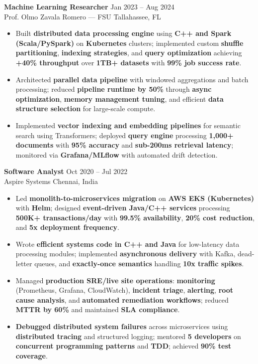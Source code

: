 \documentclass[letterpaper,10pt]{article}
\newcommand{\resumeItem}[1]{\item\small #1}
\newcommand{\resumeSubheading}[4]{
  \vspace{6pt}
  \noindent
  \textbf{#1} \hfill {\footnotesize #2} \\
  [-1pt]
  \noindent
  \small #3 \hfill {\small #4}
  \vspace{3pt}
}
\newcommand{\resumeItemsStart}{\vspace{-2pt}\begin{itemize}}
\newcommand{\resumeItemsEnd}{\end{itemize}\vspace{6pt}}
\begin{document}
\resumeSubheading
{Machine Learning Researcher}{Jan 2023 -- Aug 2024}
{Prof. Olmo Zavala Romero — FSU}{Tallahassee, FL}
\resumeItemsStart
\resumeItem{Built \textbf{distributed data processing engine} using \textbf{C++ and Spark (Scala/PySpark)} on \textbf{Kubernetes} clusters; implemented custom \textbf{shuffle partitioning}, \textbf{indexing strategies}, and \textbf{query optimization} achieving \textbf{+40\% throughput} over \textbf{1TB+ datasets} with \textbf{99\% job success rate}.}
\resumeItem{Architected \textbf{parallel data pipeline} with windowed aggregations and batch processing; reduced \textbf{pipeline runtime by 50\%} through \textbf{async optimization}, \textbf{memory management tuning}, and efficient \textbf{data structure selection} for large-scale compute.}
\resumeItem{Implemented \textbf{vector indexing and embedding pipelines} for semantic search using Transformers; deployed \textbf{query engine} processing \textbf{1,000+ documents} with \textbf{95\% accuracy} and \textbf{sub-200ms retrieval latency}; monitored via \textbf{Grafana/MLflow} with automated drift detection.}
\resumeItemsEnd
\vspace{-12pt}

\resumeSubheading
{Software Analyst}{Oct 2020 -- Jul 2022}
{Aspire Systems}{Chennai, India}
\resumeItemsStart
\resumeItem{Led \textbf{monolith-to-microservices migration} on \textbf{AWS EKS (Kubernetes)} with \textbf{Helm}; designed \textbf{event-driven Java/C++ services} processing \textbf{500K+ transactions/day} with \textbf{99.5\% availability}, \textbf{20\% cost reduction}, and \textbf{5x deployment frequency}.}
\resumeItem{Wrote \textbf{efficient systems code in C++ and Java} for low-latency data processing modules; implemented \textbf{asynchronous delivery} with Kafka, dead-letter queues, and \textbf{exactly-once semantics} handling \textbf{10x traffic spikes}.}
\resumeItem{Managed \textbf{production SRE/live site operations}: \textbf{monitoring} (Prometheus, Grafana, CloudWatch), \textbf{incident triage}, \textbf{alerting}, \textbf{root cause analysis}, and \textbf{automated remediation workflows}; reduced \textbf{MTTR by 60\%} and maintained \textbf{SLA compliance}.}
\resumeItem{\textbf{Debugged distributed system failures} across microservices using \textbf{distributed tracing} and structured logging; mentored \textbf{5 developers} on \textbf{concurrent programming patterns} and \textbf{TDD}; achieved \textbf{90\% test coverage}.}
\resumeItemsEnd
\vspace{-8pt}


\end{document}
